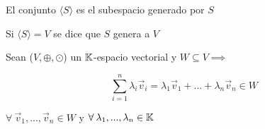 \begin{definition}
    El conjunto $\langle S \rangle$ es el subespacio generado por $S$
\end{definition}

\begin{definition}
    Si $\langle S \rangle = V$ se dice que $S$ genera a $V$
\end{definition}

\begin{theorem}
    Sean ($V, \oplus, \odot$)  un $\mathbb{K}$-espacio vectorial y $W \subseteq V \implies$

    \begin{equation*}
        \sum_{i=1}^{n}  {\lambda}_{i}{\vec{v}}_{i} =  {\lambda}_{1}{\vec{v}}_{1}+...+ {\lambda}_{n}{\vec{v}}_{n} \in W
    \end{equation*}

    $\forall \: {\vec{v}}_{1},...,{\vec{v}}_{n} \in W$ y $\forall \: {\lambda}_{1},...,{\lambda}_{n} \in \mathbb{K}$
\end{theorem}

